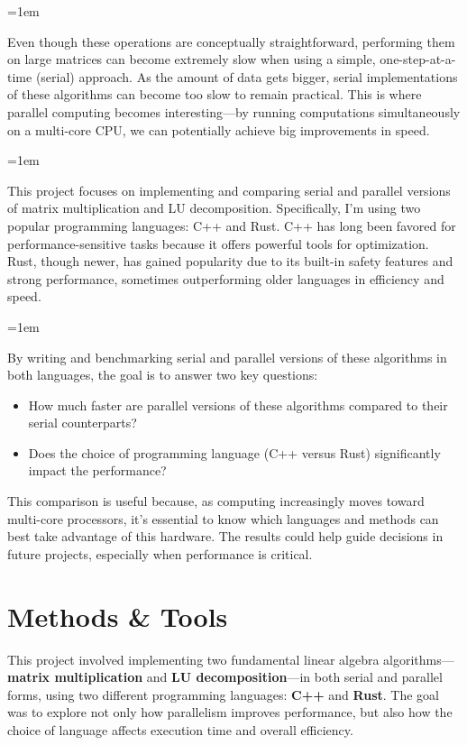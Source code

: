 \documentclass[12pt]{article}
\begin{document}
\parskip=1em

Even though these operations are conceptually straightforward, performing them on large matrices can become extremely slow when using a simple,
one-step-at-a-time (serial) approach. As the amount of data gets bigger, serial implementations of these algorithms can become too slow to remain practical. This is
where parallel computing becomes interesting---by running computations simultaneously on a multi-core CPU, we can potentially
achieve big improvements in speed.

\parskip=1em

This project focuses on implementing and comparing serial and parallel versions of matrix multiplication and LU decomposition. Specifically,
I'm using two popular programming languages: C++ and Rust. C++ has long been favored for performance-sensitive tasks because it offers powerful
tools for optimization. Rust, though newer, has gained popularity due to its built-in safety features and strong performance, sometimes outperforming
older languages in efficiency and speed.

\parskip=1em

By writing and benchmarking serial and parallel versions of these algorithms in both languages, the goal is to answer two key questions:

\begin{itemize}
    \item How much faster are parallel versions of these algorithms compared to their serial counterparts?
    \item Does the choice of programming language (C++ versus Rust) significantly impact the performance?
\end{itemize}

This comparison is useful because, as computing increasingly moves toward multi-core processors, it's essential to know which languages and methods can
best take advantage of this hardware. The results could help guide decisions in future projects, especially when performance is critical.


\section{Methods \& Tools}

This project involved implementing two fundamental linear algebra algorithms---\textbf{matrix multiplication} and \textbf{LU decomposition}---in both
serial and parallel forms, using two different programming languages: \textbf{C++} and \textbf{Rust}. The goal was to explore not only how parallelism
improves performance, but also how the choice of language affects execution time and overall efficiency.
\end{document}
